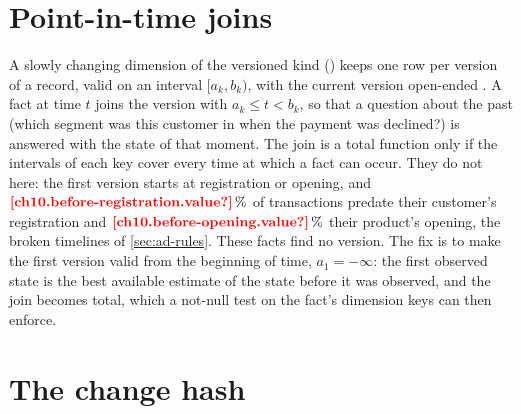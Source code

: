 \section{Point-in-time joins}\label{sec:cf-pit}

A slowly changing dimension of the versioned kind () keeps one row per version of a record, valid on an interval $[a_k, b_k)$, with the
current version open-ended \autocite{kimball2013}. A fact at time $t$ joins the version with $a_k \le t < b_k$, so that a
question about the past (which segment was this customer in when the payment was declined?) is answered with the state
of that moment. The join is a total function only if the intervals of each key cover every time at which a fact can
occur. They do not here: the first version starts at registration or opening, and $\est{ch10.before-registration}{value}\,\%$
of transactions predate their customer's registration and $\est{ch10.before-opening}{value}\,\%$ their product's opening, the
broken timelines of \cref{sec:ad-rules}. These facts find no version. The fix is to make the first version valid from the
beginning of time, $a_1 = -\infty$: the first observed state is the best available estimate of the state before it was
observed, and the join becomes total, which a not-null test on the fact's dimension keys can then enforce.

\section{The change hash}\label{sec:cf-hash}

